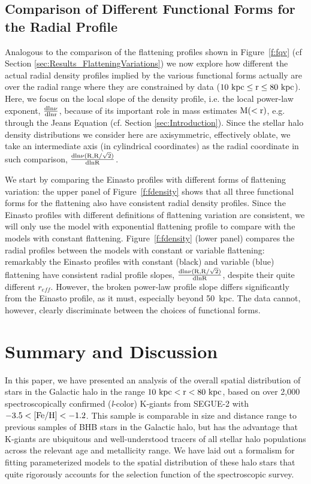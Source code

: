 \documentclass[12pt,preprint]{aastex}
\newcommand{\feh}{{\rm [Fe/H]}}
\begin{document}
\subsection{Comparison of Different Functional Forms for the Radial Profile}\label{sec:ModelComparison}

Analogous to the comparison of the flattening profiles shown in Figure~\ref{f:fqv} 
(cf Section \ref{sec:Results_FlatteningVariations}) we now explore how different the 
actual radial density profiles implied by the various functional forms actually are over the radial range where they are constrained by data ($10~\rm kpc \le \rm r \le 80~\rm kpc$). Here, we focus
on the local slope of the density profile, i.e. the local power-law exponent, $\rm \frac{dln\nu}{dlnr}$, because of its important role in mass estimates $\rm M(<r)$, e.g. through the Jeans Equation (cf. Section \ref{sec:Introduction}). Since the stellar halo density distributions we consider here are axisymmetric, effectively oblate, we take an intermediate axis (in cylindrical coordinates) as the radial coordinate 
in such comparison, $\rm \frac{dln\nu(R,R/\sqrt{2})}{dlnR}$.

We start by comparing the Einasto profiles with different forms of flattening variation: the upper panel of Figure~\ref{f:fdensity} shows that all three functional forms for the flattening also have  consistent radial density profiles. Since the Einasto profiles with different definitions of flattening variation are consistent, we will only use the model with exponential flattening profile to compare with the models with constant flattening. Figure~\ref{f:fdensity} (lower panel) compares  the radial profiles between the models with constant or variable flattening: remarkably the Einasto profiles with constant (black) and variable (blue) flattening have consistent radial profile slopes,
$\rm \frac{dln\nu(R,R/\sqrt{2})}{dlnR}$, despite their quite different $r_{eff}$.
However, the broken power-law profile slope differs significantly from the Einasto profile, as it must,
especially beyond 50~kpc. The data cannot, however, clearly discriminate between the choices of functional forms.

\section{Summary and Discussion}\label{sec:Discussion}
In this paper, we have presented an analysis of the overall spatial distribution of stars in the Galactic halo in the range $10~\rm kpc < r < 80~kpc$, based on over 2,000 spectroscopically confirmed (\textit{l}-color) K-giants from SEGUE-2 with $\rm -3.5<\feh<-1.2$. 
This sample is comparable in size and distance range to previous samples of BHB stars in the Galactic halo, but has the advantage that K-giants
are ubiquitous and well-understood tracers of all stellar halo populations across the relevant age and metallicity range.  We have laid out a formalism for fitting parameterized models to the spatial distribution of these halo stars that quite rigorously accounts for the selection function of the spectroscopic survey. 
\end{document}
